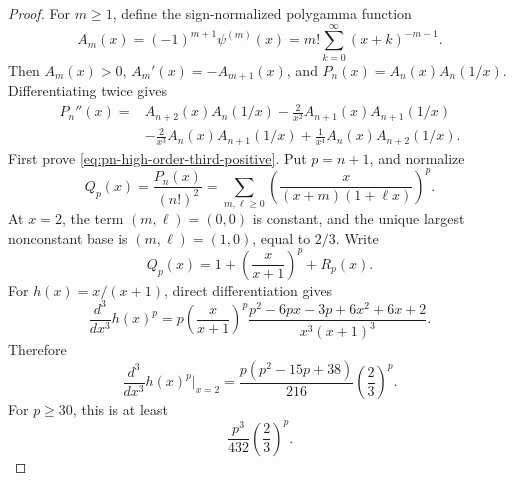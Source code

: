 \documentclass[11pt]{article}
\numberwithin{equation}{section}
\theoremstyle{definition}
\theoremstyle{remark}
\newcommand{\1}{\mathbf 1}
\begin{document}
\begin{proof}
For \(m\ge1\), define the sign-normalized polygamma function
\begin{equation}
\label{eq:sign-normalized-polygamma}
A_m(x)=(-1)^{m+1}\psi^{(m)}(x)
=m!\sum_{k=0}^{\infty}(x+k)^{-m-1}.
\end{equation}
Then \(A_m(x)>0\), \(A_m'(x)=-A_{m+1}(x)\), and \(P_n(x)=A_n(x)A_n(1/x)\).  Differentiating twice gives
\begin{equation}
\label{eq:pn-second-derivative-normalized}
\begin{aligned}
P_n''(x)=&
A_{n+2}(x)A_n(1/x)
-\frac{2}{x^2}A_{n+1}(x)A_{n+1}(1/x)\\
&-\frac{2}{x^3}A_n(x)A_{n+1}(1/x)
+\frac{1}{x^4}A_n(x)A_{n+2}(1/x).
\end{aligned}
\end{equation}
First prove \eqref{eq:pn-high-order-third-positive}.  Put \(p=n+1\), and normalize
\begin{equation}
\label{eq:qp-normalized-product}
Q_p(x)=\frac{P_n(x)}{(n!)^2}
=\sum_{m,\ell\ge0}
\left(\frac{x}{(x+m)(1+\ell x)}\right)^p.
\end{equation}
At \(x=2\), the term \((m,\ell)=(0,0)\) is constant, and the unique largest nonconstant base is \((m,\ell)=(1,0)\), equal to \(2/3\).  Write
\begin{equation}
\label{eq:qp-dominant-split}
Q_p(x)=1+\left(\frac{x}{x+1}\right)^p+R_p(x).
\end{equation}
For \(h(x)=x/(x+1)\), direct differentiation gives
\begin{equation}
\label{eq:h-third-derivative}
\frac{d^3}{dx^3}h(x)^p
=p\left(\frac{x}{x+1}\right)^p
\frac{p^2-6px-3p+6x^2+6x+2}{x^3(x+1)^3}.
\end{equation}
Therefore
\begin{equation}
\label{eq:h-third-at-two}
\frac{d^3}{dx^3}h(x)^p\bigg|_{x=2}
=\frac{p(p^2-15p+38)}{216}\left(\frac23\right)^p.
\end{equation}
For \(p\ge30\), this is at least
\begin{equation}
\label{eq:h-third-lower}
\frac{p^3}{432}\left(\frac23\right)^p.
\end{equation}


\end{proof}
\end{document}
